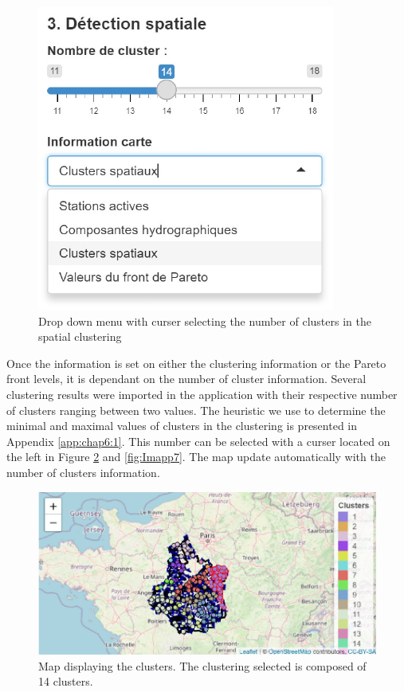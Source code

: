 \begin{figure}[htbp]
  \centering
  \includegraphics[]{figs/Chap6/Im_appbis.pdf}
  \caption{Drop down menu with curser selecting the number of clusters in the spatial clustering}
  \label{fig:Imapp}
\end{figure}   
   
Once the information is set on either the clustering information or the Pareto front levels, it is dependant on the number of cluster information. Several clustering results were imported in the application with their respective number of clusters ranging between two values. The heuristic we use to determine the minimal and maximal values of clusters in the clustering is presented in Appendix \ref{app:chap6:1}. This number can be selected with a curser located on the left in Figure \ref{fig:Imapp6} and \ref{fig:Imapp7}. The map update automatically with the number of clusters information.  

\begin{figure}[htbp]
  \centering
  \includegraphics[]{figs/Chap6/Im_appbis6.pdf}
  \caption{Map displaying the clusters. The clustering selected is composed of 14 clusters.}
  \label{fig:Imapp6}
\end{figure}

